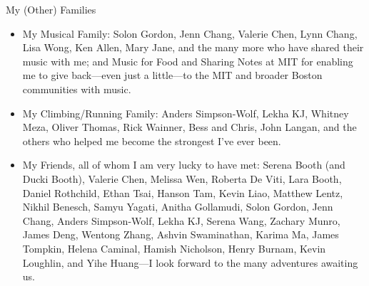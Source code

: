 \begin{center}{My (Other) Families}\end{center} 
    \begin{itemize}
    \item My Musical Family: Solon Gordon, Jenn Chang, Valerie Chen, Lynn Chang,
        Lisa Wong, Ken Allen, Mary Jane, and the many more who have shared their
            music with me; and Music for Food and Sharing Notes at MIT for
            enabling me to give back---even just a little---to the MIT and
            broader Boston communities with music.    

    \item My Climbing/Running Family: Anders Simpson-Wolf, Lekha KJ, Whitney
        Meza, Oliver Thomas, Rick Wainner, Bess and Chris, John Langan, and the
            others who helped me become the strongest I've ever been.

    \item My Friends, all of whom I am very lucky to have met: Serena Booth (and
        Ducki Booth), Valerie Chen, Melissa Wen, Roberta De Viti, Lara Booth,
            Daniel Rothchild, Ethan Tsai, Hanson Tam, Kevin Liao, Matthew Lentz,
            Nikhil Benesch, Samyu Yagati, Anitha Gollamudi, Solon Gordon, Jenn
            Chang, Anders Simpson-Wolf, Lekha KJ, Serena Wang, Zachary Munro,
            James Deng, Wentong Zhang, Ashvin Swaminathan, Karima Ma, James
            Tompkin, Helena Caminal, Hamish Nicholson, Henry Burnam, Kevin
            Loughlin, and Yihe Huang---I look forward to the many adventures
            awaiting us.
    \end{itemize}
 
